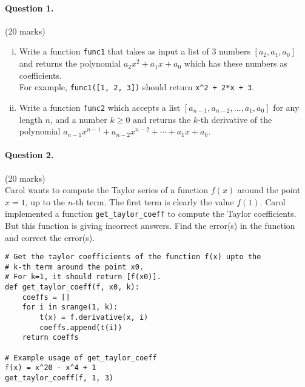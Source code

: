 \documentclass[12pt]{article}
\begin{document}
\paragraph{Question 1.}\hfill (20 marks)\\
\begin{enumerate}[(i)]
    \item Write a function \verb|func1| that takes as input a list of
    3 numbers $[a_2, a_1, a_0]$ and returns the polynomial $a_2 x^2 + a_1 x
      + a_0$ which has these numbers as coefficients.\\
      For example, \verb|func1([1, 2, 3])|  should
      return \verb|x^2 + 2*x + 3|.
    \item Write a  function \verb|func2| which accepts a list $[a_{n-1},
    a_{n-2}, \dots, a_1, a_0]$ for any length $n$, and a number $k\geq 0$
    and returns the $k$-th derivative of the
polynomial $a_{n-1} x^{n-1} + a_{n-2} x^{n-2} + \cdots
    + a_1 x + a_0.$
\end{enumerate}


\bigskip
\bigskip
\bigskip
\paragraph{Question 2.}\hfill (20 marks)\\
Carol wants to compute the Taylor series of a function $f(x)$ around the
point $x=1$, up to the $n$-th term. The first term is clearly the value
$f(1)$. 
Carol implemented a function \verb|get_taylor_coeff| to compute the
Taylor coefficients. But this function is giving incorrect answers. Find
the error(s) in the function and correct the error(s).
\begin{verbatim}
# Get the taylor coefficients of the function f(x) upto the
# k-th term around the point x0. 
# For k=1, it should return [f(x0)].
def get_taylor_coeff(f, x0, k):
    coeffs = []
    for i in srange(1, k):
        t(x) = f.derivative(x, i)
        coeffs.append(t(i))
    return coeffs

# Example usage of get_taylor_coeff
f(x) = x^20 - x^4 + 1
get_taylor_coeff(f, 1, 3)
\end{verbatim}


\bigskip
\bigskip
\bigskip
\newpage 
\end{document}
